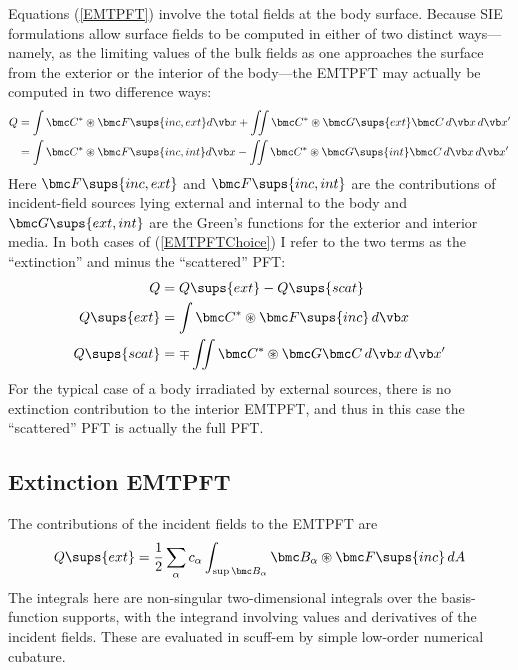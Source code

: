 Equations (\ref{EMTPFT}) involve the total fields at the
body surface. Because SIE formulations allow surface fields
to be computed in either of two distinct ways---namely, as the
limiting values of the bulk fields as one approaches the
surface from the exterior or the interior of the body---the EMTPFT
may actually be computed in two difference ways:
\begin{subequations}
\begin{align}
 Q &=   \int \bmc C^* \circledast \bmc F\sups{inc,ext} d\vb x
      + \iint \bmc C^* \circledast \bmc G\sups{ext} \bmc C\,d\vb x \,d\vb x^\prime
\\
   &=   \int \bmc C^* \circledast \bmc F\sups{inc,int} d\vb x
      - \iint \bmc C^* \circledast \bmc G\sups{int} \bmc C\,d\vb x \,d\vb x^\prime
\end{align}
\label{EMTPFTChoice}
\end{subequations}
Here $\bmc F\sups{inc,ext}$ and $\bmc F\sups{inc,int}$ are
the contributions of incident-field sources lying external and internal
to the body and $\bmc G\sups{ext,int}$ are the Green's functions
for the exterior and interior media.
In both cases of (\ref{EMTPFTChoice}) I refer to the two
terms as the ``extinction'' and minus the ``scattered''
PFT:
\begin{align*}
 Q&=Q\sups{ext} - Q\sups{scat}
\\
 Q\sups{ext}
&=\int \bmc C^* \circledast \bmc F\sups{inc} \, d\vb x
\\
 Q\sups{scat}
&=\mp \iint \bmc C^* \circledast \bmc G \bmc C\,d\vb x \, d\vb x^\prime
\end{align*}
For the typical case of a body irradiated by external sources,
there is no extinction contribution to the interior EMTPFT, and 
thus in this case the ``scattered'' PFT is actually the full PFT.

\subsection{Extinction EMTPFT}

The contributions of the incident fields to the EMTPFT are
$$ Q\sups{ext}=
   \frac{1}{2}\sum_{\alpha} c_\alpha
   \int_{\sup \bmc B_\alpha} \bmc B_\alpha \circledast \bmc F\sups{inc} \, dA
$$
The integrals here are non-singular two-dimensional integrals over
the basis-function supports, with the integrand involving values 
and derivatives of the incident fields. These are evaluated 
in {\sc scuff-em} by simple low-order numerical cubature.

